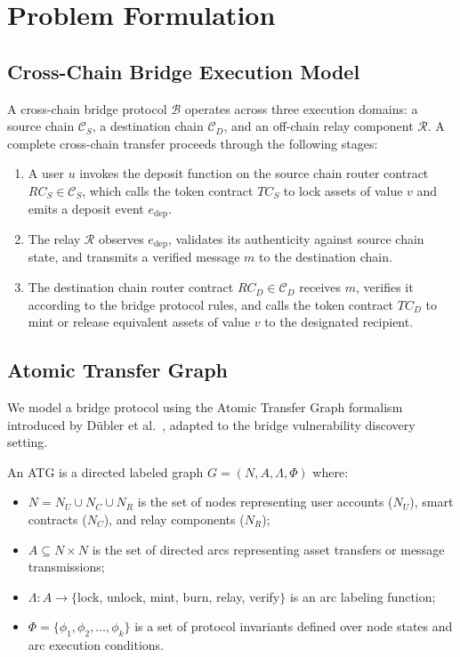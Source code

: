 \documentclass[journal]{IEEEtran}
\begin{document}
\section{Problem Formulation}\label{sec:problem}

\subsection{Cross-Chain Bridge Execution Model}

A cross-chain bridge protocol $\mathcal{B}$ operates across three execution domains: a source chain $\mathcal{C}_S$, a destination chain $\mathcal{C}_D$, and an off-chain relay component $\mathcal{R}$. A complete cross-chain transfer proceeds through the following stages:

\begin{enumerate}
    \item A user $u$ invokes the deposit function on the source chain router contract $RC_S \in \mathcal{C}_S$, which calls the token contract $TC_S$ to lock assets of value $v$ and emits a deposit event $e_{\text{dep}}$.
    \item The relay $\mathcal{R}$ observes $e_{\text{dep}}$, validates its authenticity against source chain state, and transmits a verified message $m$ to the destination chain.
    \item The destination chain router contract $RC_D \in \mathcal{C}_D$ receives $m$, verifies it according to the bridge protocol rules, and calls the token contract $TC_D$ to mint or release equivalent assets of value $v$ to the designated recipient.
\end{enumerate}

\subsection{Atomic Transfer Graph}

We model a bridge protocol using the Atomic Transfer Graph formalism introduced by D\"ubler et al.~\cite{dubler2025atg}, adapted to the bridge vulnerability discovery setting.

\begin{definition}
An ATG is a directed labeled graph $G = (N, A, \Lambda, \Phi)$ where:
\begin{itemize}
    \item $N = N_U \cup N_C \cup N_R$ is the set of nodes representing user accounts ($N_U$), smart contracts ($N_C$), and relay components ($N_R$);
    \item $A \subseteq N \times N$ is the set of directed arcs representing asset transfers or message transmissions;
    \item $\Lambda: A \rightarrow \{$lock, unlock, mint, burn, relay, verify$\}$ is an arc labeling function;
    \item $\Phi = \{\phi_1, \phi_2, \ldots, \phi_k\}$ is a set of protocol invariants defined over node states and arc execution conditions.
\end{itemize}
\end{definition}
\end{document}

